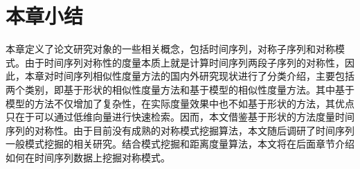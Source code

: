 \section{本章小结}
本章定义了论文研究对象的一些相关概念，包括时间序列，对称子序列和对称模式。由于时间序列对称性的度量本质上就是计算时间序列两段子序列的对称性，因此，本章对时间序列相似性度量方法的国内外研究现状进行了分类介绍，主要包括两个类别，即基于形状的相似性度量方法和基于模型的相似性度量方法。其中基于模型的方法不仅增加了复杂性，在实际度量效果中也不如基于形状的方法，其优点只在于可以通过低维向量进行快速检索。因而，本文借鉴基于形状的方法度量时间序列的对称性。由于目前没有成熟的对称模式挖掘算法，本文随后调研了时间序列一般模式挖掘的相关研究。结合模式挖掘和距离度量算法，本文将在后面章节介绍如何在时间序列数据上挖掘对称模式。